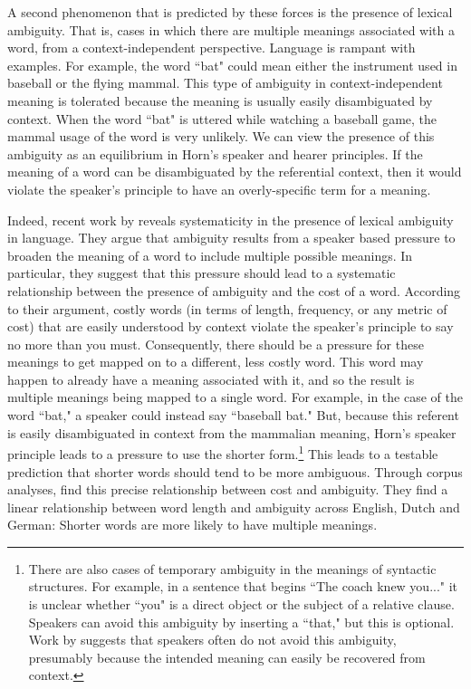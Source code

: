 \documentclass[man, noapacite, 12pt]{apa2}
\begin{document}
A second phenomenon that is predicted by these forces is the presence of lexical ambiguity. That is, cases in which there are multiple meanings associated with a word, from a context-independent perspective. Language is rampant with examples. For example, the word ``bat" could mean either the instrument used in baseball or the flying mammal. This type of ambiguity in context-independent meaning is tolerated because the meaning is usually easily disambiguated by context. When the word ``bat" is uttered while watching a baseball game,  the mammal usage of the word is very unlikely. We can view the presence of this ambiguity as an equilibrium in Horn's speaker and hearer principles. If the meaning of a word can be disambiguated by the referential context, then it would violate the speaker's principle to have an overly-specific term for a meaning. 

Indeed, recent work by  reveals systematicity in the presence of lexical ambiguity in language. They argue that ambiguity results from a speaker based pressure to broaden the meaning of a word to include multiple possible meanings. In particular, they suggest that this pressure should lead to a systematic relationship between the presence of ambiguity and the cost of a word. According to their argument, costly words (in terms of length, frequency, or any metric of cost) that are easily understood by context violate the speaker's principle to say no more than you must. Consequently, there should be a pressure for these meanings to get mapped on to a different, less costly word. This word may happen to already have a meaning associated with it, and so the result  is multiple meanings being mapped to a single word. For example, in the case of the word ``bat," a speaker could instead say ``baseball bat." But, because this referent is easily disambiguated in context from the mammalian meaning,  Horn's speaker principle leads to a pressure to use the shorter form.\footnote{There are also cases of temporary ambiguity in the meanings of syntactic structures. For example, in a sentence that begins ``The coach knew you..." it is unclear whether ``you" is a direct object or the subject of a relative clause. Speakers can avoid this ambiguity by inserting a ``that," but this is optional. Work by  suggests that speakers often do not avoid this ambiguity, presumably because the intended meaning can easily be recovered from context.} This leads to a testable prediction that shorter words should tend to be more ambiguous.  Through corpus analyses,  find this precise  relationship between cost and ambiguity. They find a linear relationship between word length and ambiguity across English, Dutch and German: Shorter words are more likely to have multiple meanings. 
\end{document}
